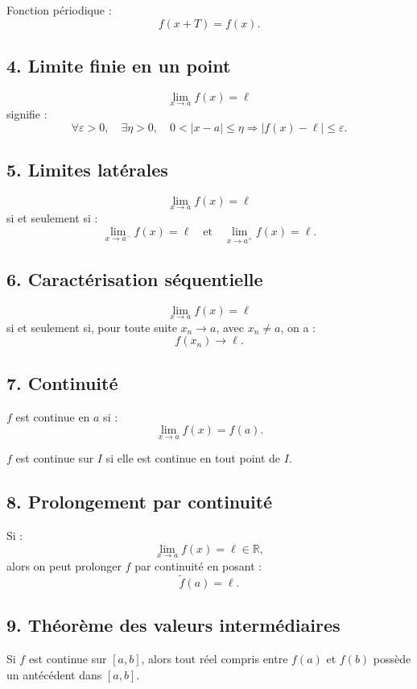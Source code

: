 \documentclass[11pt,a4paper]{article}
\newcommand{\R}{\mathbb R}
\newcommand{\implique}{\Longrightarrow}
\begin{document}
Fonction périodique :
\[
f(x+T)=f(x).
\]

\subsection*{4. Limite finie en un point}

\[
\lim_{x\to a}f(x)=\ell
\]
signifie :
\[
\forall\varepsilon>0,\quad \exists\eta>0,\quad
0<|x-a|\leq\eta\implique |f(x)-\ell|\leq\varepsilon.
\]

\subsection*{5. Limites latérales}

\[
\lim_{x\to a}f(x)=\ell
\]
si et seulement si :
\[
\lim_{x\to a^-}f(x)=\ell
\quad\text{et}\quad
\lim_{x\to a^+}f(x)=\ell.
\]

\subsection*{6. Caractérisation séquentielle}

\[
\lim_{x\to a}f(x)=\ell
\]
si et seulement si, pour toute suite \(x_n\to a\), avec \(x_n\neq a\), on a :
\[
f(x_n)\to\ell.
\]

\subsection*{7. Continuité}

\(f\) est continue en \(a\) si :
\[
\lim_{x\to a}f(x)=f(a).
\]

\(f\) est continue sur \(I\) si elle est continue en tout point de \(I\).

\subsection*{8. Prolongement par continuité}

Si :
\[
\lim_{x\to a}f(x)=\ell\in\R,
\]
alors on peut prolonger \(f\) par continuité en posant :
\[
\widetilde f(a)=\ell.
\]

\subsection*{9. Théorème des valeurs intermédiaires}

Si \(f\) est continue sur \([a,b]\), alors tout réel compris entre \(f(a)\) et \(f(b)\) possède un antécédent dans \([a,b]\).
\end{document}
